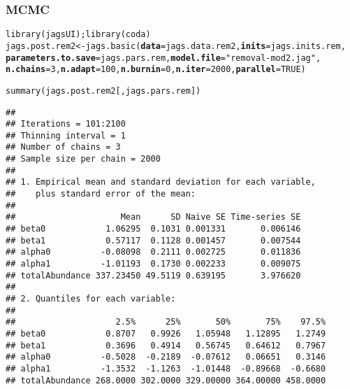 \documentclass[color=usenames,dvipsnames]{beamer}\usepackage[]{graphicx}\usepackage[]{xcolor}
\makeatletter
\newcommand{\hlnum}[1]{\textcolor[rgb]{0.69,0.494,0}{#1}}%
\newcommand{\hlsng}[1]{\textcolor[rgb]{0.749,0.012,0.012}{#1}}%
\newcommand{\hldef}[1]{\textcolor[rgb]{0,0,0}{#1}}%
\newcommand{\hlkwb}[1]{\textcolor[rgb]{0,0.341,0.682}{#1}}%
\newcommand{\hlkwc}[1]{\textcolor[rgb]{0,0,0}{\textbf{#1}}}%
\newcommand{\hlkwd}[1]{\textcolor[rgb]{0.004,0.004,0.506}{#1}}%
\newenvironment{kframe}{%
 \def\at@end@of@kframe{}%
 \ifinner\ifhmode%
  \def\at@end@of@kframe{\end{minipage}}%
  \begin{minipage}{\columnwidth}%
 \fi\fi%
 \def\FrameCommand##1{\hskip\@totalleftmargin \hskip-\fboxsep
 \colorbox{shadecolor}{##1}\hskip-\fboxsep
     \hskip-\linewidth \hskip-\@totalleftmargin \hskip\columnwidth}%
 \MakeFramed {\advance\hsize-\width
   \@totalleftmargin\z@ \linewidth\hsize
   \@setminipage}}%
 {\par\unskip\endMakeFramed%
 \at@end@of@kframe}
\newenvironment{knitrout}{}{} %
\makeatother
\begin{document}
\begin{frame}[fragile]
  \frametitle{MCMC}
  \small
\begin{knitrout}\tiny
{}\color{fgcolor}\begin{kframe}
\begin{alltt}
\hlkwd{library}\hldef{(jagsUI);} \hlkwd{library}\hldef{(coda)}
\hldef{jags.post.rem2} \hlkwb{<-} \hlkwd{jags.basic}\hldef{(}\hlkwc{data}\hldef{=jags.data.rem2,} \hlkwc{inits}\hldef{=jags.inits.rem,}
                             \hlkwc{parameters.to.save}\hldef{=jags.pars.rem,} \hlkwc{model.file}\hldef{=}\hlsng{"removal-mod2.jag"}\hldef{,}
                             \hlkwc{n.chains}\hldef{=}\hlnum{3}\hldef{,} \hlkwc{n.adapt}\hldef{=}\hlnum{100}\hldef{,} \hlkwc{n.burnin}\hldef{=}\hlnum{0}\hldef{,} \hlkwc{n.iter}\hldef{=}\hlnum{2000}\hldef{,} \hlkwc{parallel}\hldef{=}\hlnum{TRUE}\hldef{)}
\end{alltt}
\end{kframe}
\end{knitrout}

\pause

\begin{knitrout}\tiny
{}\color{fgcolor}\begin{kframe}
\begin{alltt}
\hlkwd{summary}\hldef{(jags.post.rem2[,jags.pars.rem])}
\end{alltt}
\begin{verbatim}
## 
## Iterations = 101:2100
## Thinning interval = 1 
## Number of chains = 3 
## Sample size per chain = 2000 
## 
## 1. Empirical mean and standard deviation for each variable,
##    plus standard error of the mean:
## 
##                     Mean      SD Naive SE Time-series SE
## beta0            1.06295  0.1031 0.001331       0.006146
## beta1            0.57117  0.1128 0.001457       0.007544
## alpha0          -0.08098  0.2111 0.002725       0.011836
## alpha1          -1.01193  0.1730 0.002233       0.009075
## totalAbundance 337.23450 49.5119 0.639195       3.976620
## 
## 2. Quantiles for each variable:
## 
##                    2.5%      25%       50%       75%    97.5%
## beta0            0.8707   0.9926   1.05948   1.12895   1.2749
## beta1            0.3696   0.4914   0.56745   0.64612   0.7967
## alpha0          -0.5028  -0.2189  -0.07612   0.06651   0.3146
## alpha1          -1.3532  -1.1263  -1.01448  -0.89668  -0.6680
## totalAbundance 268.0000 302.0000 329.00000 364.00000 458.0000
\end{verbatim}
\end{kframe}
\end{knitrout}
\end{frame}
\end{document}
